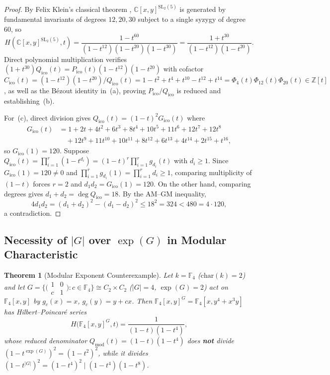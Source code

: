 \documentclass[11pt]{article}
\newtheorem{theorem}{Theorem}[section]
\theoremstyle{definition}
\theoremstyle{remark}
\begin{document}
\begin{proof}
By Felix Klein's classical theorem \cite[Section~4.5]{Sturmfels}, $\mathbb{C}[x,y]^{\mathrm{SL}_2(5)}$ is generated by fundamental invariants of degrees $12, 20, 30$ subject to a single syzygy of degree $60$, so
\[
H(\mathbb{C}[x,y]^{\mathrm{SL}_2(5)}, t) = \frac{1 - t^{60}}{(1 - t^{12})(1 - t^{20})(1 - t^{30})} = \frac{1 + t^{30}}{(1 - t^{12})(1 - t^{20})}.
\]
Direct polynomial multiplication verifies $(1 + t^{30}) Q_{\mathrm{ico}}(t) = P_{\mathrm{ico}}(t) (1 - t^{12})(1 - t^{20})$ with cofactor $C_{\mathrm{ico}}(t) = (1 - t^{12})(1 - t^{20}) / Q_{\mathrm{ico}}(t) = 1 - t^2 + t^4 + t^{10} - t^{12} + t^{14} = \Phi_4(t)\Phi_{12}(t)\Phi_{20}(t) \in \mathbb{Z}[t]$, as well as the B\'ezout identity in~(a), proving $P_{\mathrm{ico}}/Q_{\mathrm{ico}}$ is reduced and establishing~(b).

For~(c), direct division gives $Q_{\mathrm{ico}}(t) = (1 - t)^2 G_{\mathrm{ico}}(t)$ where
\[
\begin{aligned}
G_{\mathrm{ico}}(t) &= 1 + 2t + 4t^2 + 6t^3 + 8t^4 + 10t^5 + 11t^6 + 12t^7 + 12t^8\\
&\quad + 12t^9 + 11t^{10} + 10t^{11} + 8t^{12} + 6t^{13} + 4t^{14} + 2t^{15} + t^{16},
\end{aligned}
\]
so $G_{\mathrm{ico}}(1) = 120$. Suppose $Q_{\mathrm{ico}}(t) = \prod_{i=1}^r (1 - t^{d_i}) = (1 - t)^r \prod_{i=1}^r g_{d_i}(t)$ with $d_i \ge 1$. Since $G_{\mathrm{ico}}(1) = 120 \ne 0$ and $\prod_{i=1}^r g_{d_i}(1) = \prod_{i=1}^r d_i \ge 1$, comparing multiplicity of $(1 - t)$ forces $r = 2$ and $d_1 d_2 = G_{\mathrm{ico}}(1) = 120$. On the other hand, comparing degrees gives $d_1 + d_2 = \deg Q_{\mathrm{ico}} = 18$. By the AM--GM inequality,
\[
4 d_1 d_2 = (d_1 + d_2)^2 - (d_1 - d_2)^2 \le 18^2 = 324 < 480 = 4 \cdot 120,
\]
a contradiction.
\end{proof}

\subsection{Necessity of \texorpdfstring{$|G|$}{|G|} over \texorpdfstring{$\exp(G)$}{exp(G)} in Modular Characteristic}

\begin{theorem}[Modular Exponent Counterexample]
\label{thm:f4}
Let $k = \mathbb{F}_4$ ($\mathrm{char}(k) = 2$) and let $G = \bigl\{ \bigl(\begin{smallmatrix} 1 & 0 \\ c & 1 \end{smallmatrix}\bigr) : c \in \mathbb{F}_4 \bigr\} \cong C_2 \times C_2$ ($|G| = 4$, $\exp(G) = 2$) act on $\mathbb{F}_4[x,y]$ by $g_c(x) = x$, $g_c(y) = y + cx$. Then $\mathbb{F}_4[x,y]^G = \mathbb{F}_4[x, y^4 + x^3 y]$ has Hilbert--Poincar\'e series
\[
H\bigl(\mathbb{F}_4[x,y]^G, t\bigr) = \frac{1}{(1 - t)(1 - t^4)},
\]
whose reduced denominator $Q_{\mathrm{mod}}(t) = (1 - t)(1 - t^4)$ does \textbf{not} divide $(1 - t^{\exp(G)})^2 = (1 - t^2)^2$, while it divides $(1 - t^{|G|})^2 = (1 - t^4)^2 \mid (1 - t^4)(1 - t^8)$.
\end{theorem}
\end{document}
